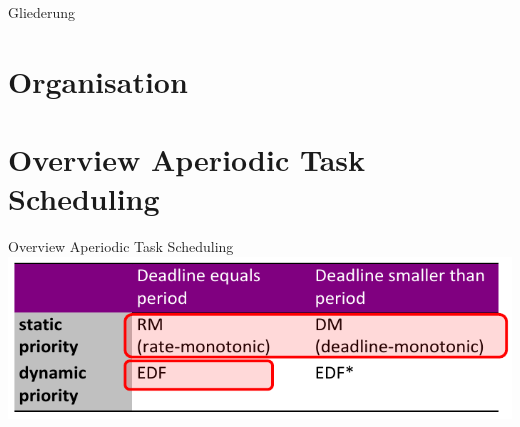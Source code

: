 \def\pascal{0}
\def\preview{1}









\begin{withoutheadline}
  \begin{withoutfootline}
    \begin{frame}
      \titlepagesecond
    \end{frame}
  \end{withoutfootline}

  \begin{frame}[shrink=10]{Gliederung}
    \tableofcontents[hideallsubsections]
  \end{frame}
\end{withoutheadline}

\section{Organisation}

\setcounter{section}{-1}


\section{Overview Aperiodic Task Scheduling}

\begin{frame}{Overview Aperiodic Task Scheduling}
  \centering
  \includegraphics[width=\textwidth]{./figures/overview_real_time_scheduling.png}
\end{frame}

